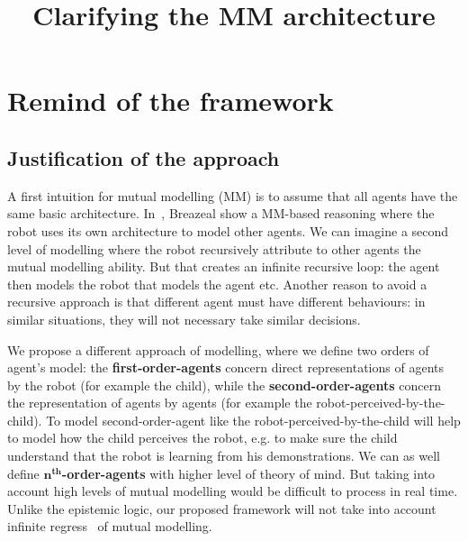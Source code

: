 \documentclass[conference]{IEEEtran}
\begin{document}
\title{Clarifying the MM architecture}


\author{

}



\maketitle

\IEEEpeerreviewmaketitle



\section{Remind of the framework}
\subsection{Justification of the approach}

A first intuition for mutual modelling (MM) is to assume that all agents have the same basic architecture. In~\cite{breazeal2006using}, Breazeal show a MM-based reasoning where the robot uses its own architecture to model other agents. We can imagine a second level of modelling where the robot recursively attribute to other agents the mutual modelling ability. But that creates an infinite recursive loop: the agent then models the robot that models the agent etc. Another reason to avoid a recursive approach is that different agent must have different behaviours: in similar situations, they will not necessary take similar decisions. 

We propose a different approach of modelling, where we define two orders of agent's model: the \textbf{first-order-agents} concern direct representations of agents by the robot (for example the child), while the \textbf{second-order-agents} concern the representation of agents by agents (for example the robot-perceived-by-the-child). 
To model second-order-agent like the robot-perceived-by-the-child will help to model how the child perceives the robot, e.g. to make sure the child understand that the robot is learning from his demonstrations. 
We can as well define $\textbf{n}^{\textbf{th}}$\textbf{-order-agents} with higher level of theory of mind. But taking into account high levels of mutual modelling would be difficult to process in real time. Unlike the epistemic logic, our proposed framework will not take into account infinite regress~\cite{clark1991grounding} of mutual modelling.
\end{document}

